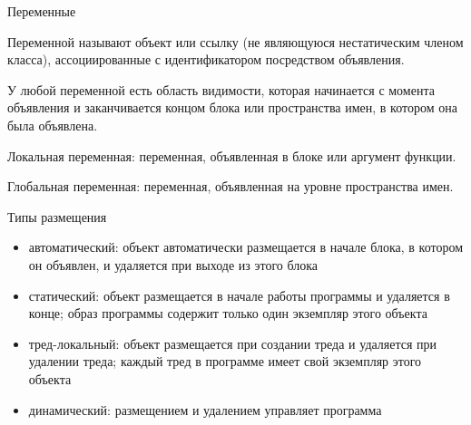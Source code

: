 \documentclass[unknownkeysallowed,xcolor=table]{beamer}
\begin{document}
\begin{frame}{Переменные}

Переменной называют объект или ссылку (не являющуюся нестатическим членом класса), ассоциированные с идентификатором посредством объявления. \vspace{1em}

У любой переменной есть область видимости, которая начинается с момента объявления и заканчивается концом блока или пространства имен, в котором она была объявлена. \vspace{1.5em}

Локальная переменная: переменная, объявленная в блоке или аргумент функции. \vspace{1em}

Глобальная переменная: переменная, объявленная на уровне пространства имен. \vspace{1em}

\end{frame}

\begin{frame}{Типы размещения}

\begin{itemize}

  \item автоматический: объект автоматически размещается в начале блока, в котором он объявлен, и удаляется при выходе из этого блока \vspace{1em}
  
  \item статический: объект размещается в начале работы программы и удаляется в конце; образ программы содержит только один экземпляр этого объекта \vspace{1em}
  
  \item тред-локальный: объект размещается при создании треда и удаляется при удалении треда; каждый тред в программе имеет свой экземпляр этого объекта \vspace{1em}
  
  \item динамический: размещением и удалением управляет программа

\end{itemize}

\end{frame}
\end{document}
